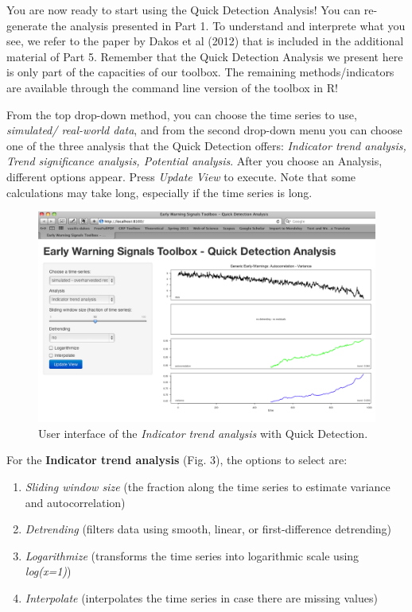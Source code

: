 \documentclass[12pt,a4paper,final]{article}
\begin{document}
\begin{doublespacing}
You are now ready to start using the Quick Detection Analysis! You can re-generate the analysis presented in Part 1. To understand and interprete what you see, we refer to the paper by Dakos et al (2012) that is included in the additional material of Part 5. Remember that the Quick Detection Analysis we present here is only part of the capacities of our toolbox. The remaining methods/indicators are available through the command line version of the toolbox in R!

From the top drop-down method, you can choose the time series to use, \textit{simulated/ real-world data}, and from the second drop-down menu you can choose one of the three analysis that the Quick Detection offers: \textit{Indicator trend analysis, Trend significance analysis, Potential analysis}. After you choose an Analysis, different options appear. Press \textit{Update View} to execute. Note that some calculations may take long, especially if the time series is long.
\begin{figure}[ht]
\begin{center}
\includegraphics[scale=0.4]{demo_start.png}
\caption{User interface of the \textit{Indicator trend analysis} with Quick Detection.}
\end{center}
\end{figure}

For the \textbf{Indicator trend analysis} (Fig. 3), the options to select are:
\begin{enumerate}
\item \textit{Sliding window size} (the fraction along the time series to estimate variance and autocorrelation)
\item  \textit{Detrending} (filters data using smooth, linear, or first-difference detrending)
\item \textit{Logarithmize} (transforms the time series into logarithmic scale using \textit{log(x=1)})
\item \textit{Interpolate} (interpolates the time series in case there are missing values)
\end{enumerate}


\end{doublespacing}
\end{document}
